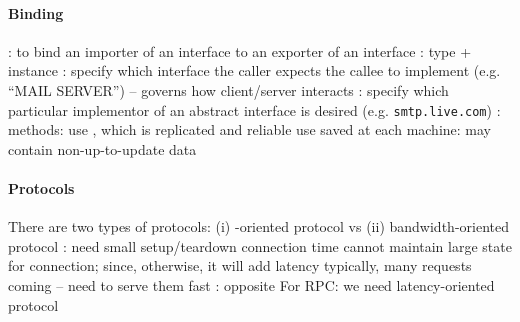 \documentclass{memo}
\begin{document}
   \eit
\eit

\paragraph{Binding}
\bit
\w {}: to bind an importer of an interface to an exporter of an
    interface 
   \bit
   \w {}: {type} + {instance}
     \bit
     \w {}: specify which interface the caller expects the callee to
     implement (e.g. ``MAIL SERVER'') -- governs how client/server interacts
     \w {}: specify which particular implementor of an abstract
     interface is desired (e.g. {\tt{}smtp.live.com})
     \eit
   \eit
\w {}:
   \bit
   \w methods:
     \ben
     \w use , which is replicated and reliable
     \w use  saved at each machine: may contain
     non-up-to-update data
     \een
   \eit
\eit

\paragraph{\textcolor{blue2}{Protocols}}
\bit
\w There are two types of protocols: (i) -oriented protocol vs
(ii) bandwidth-oriented protocol
  \bit
  \w {}: 
     \bit
     \w need small setup/teardown connection time
     \w cannot maintain large state for connection; since, otherwise, it will
     add latency
     \w typically, many requests coming -- need to serve them fast
     \eit
  \w {}: opposite
  \eit
\w For RPC: we need latency-oriented protocol
   
\eit
\end{document}
